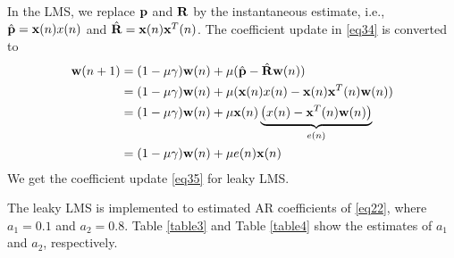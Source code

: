 \documentclass[10pt]{article}
\begin{document}
In the LMS, we replace ${\bf{p}}$ and $\bf{R}$ by the instantaneous estimate, i.e., $\hat{\bf{p}} = {\bf{x}}(n) x(n)$
and $\hat{\bf{R}} = {\bf{x}}(n) {\bf{x}}^T(n)$. The coefficient update in \eqref{eq34} is converted to 
\begin{align}
	{\bf{w}}(n+1) & = (1 - \mu \gamma) {\bf{w}}(n) + \mu (\hat{\bf{p}} - \hat{\bf{R}} {\bf{w}}(n)) \nonumber \\
	& = (1 - \mu \gamma) {\bf{w}}(n) + \mu ({\bf{x}}(n) x(n) - {\bf{x}}(n) {\bf{x}}^T(n) {\bf{w}}(n)) \nonumber \\
	& = (1 - \mu \gamma) {\bf{w}}(n) + \mu {\bf{x}}(n) \underbrace{\left( x(n) - {\bf{x}}^T(n) {\bf{w}}(n) \right)}_{e(n)} \nonumber \\
	& = (1 - \mu \gamma) {\bf{w}}(n) + \mu e(n) {\bf{x}}(n) \label{eq35}
\end{align}
We get the coefficient update \eqref{eq35} for leaky LMS.

The leaky LMS is implemented to estimated AR coefficients of \eqref{eq22}, where $a_1=0.1$
and $a_2 = 0.8$. Table \ref{table3} and Table \ref{table4} show the estimates of 
$a_1$ and $a_2$, respectively. 

\begin{table}[htbp]
	\caption{Estimates of $a_1$ using different $\mu$ and $\gamma$}
	\centering
\end{table}
\end{document}

